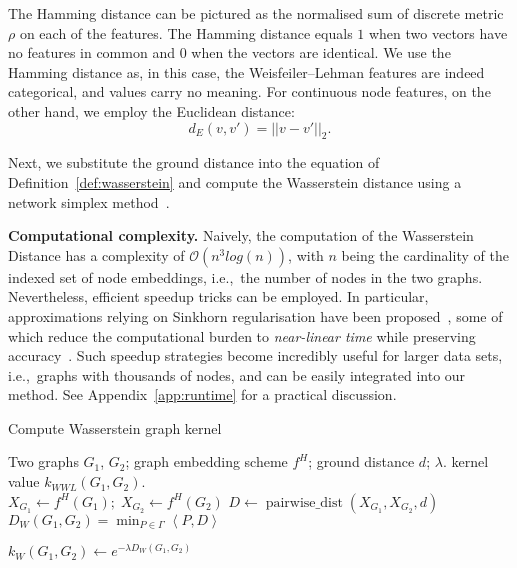 \documentclass{article}
\DeclareMathOperator{\pairwisedist}{pairwise\_dist}
\begin{document}
The Hamming distance can be pictured as the normalised sum of discrete metric $\rho$ on each of the features.
The Hamming distance equals $1$ when two vectors have no features in common and $0$ when the vectors are identical. 
We use the Hamming distance as, in this case, the Weisfeiler--Lehman features are indeed categorical, and values carry no meaning.
For continuous node features, on the other hand, we employ the Euclidean distance: 
\begin{equation}
    d_E(v,v')=||v-v'||_2.
\end{equation}

Next, we substitute the ground distance into the equation of Definition~\ref{def:wasserstein} and compute the Wasserstein distance using a network simplex method~\citep{peyre2019computational}. 

\textbf{Computational complexity.}
Naively, the computation of the Wasserstein Distance has a complexity of $\mathcal{O}(n^3log(n))$, with $n$ being the cardinality of the indexed set of node embeddings, i.e.,\ the number of nodes in the two graphs. Nevertheless, efficient speedup tricks can be employed. In particular, approximations relying on Sinkhorn regularisation have been proposed~\citep{cuturi2013sinkhorn}, some of which reduce the computational burden to \textit{near-linear time} while preserving accuracy~\citep{altschuler2017near}. Such speedup strategies become incredibly useful for larger data sets, i.e.,\ graphs with thousands of nodes, and can be easily integrated into our method. See  Appendix~\ref{app:runtime} for a practical discussion.



\begin{algorithm}[tb]
   \caption{Compute Wasserstein graph kernel}
   \label{alg:gwk}
\begin{algorithmic}
    Two graphs $G_1$, $G_2$; graph embedding scheme $f^H$; ground distance $d$; $\lambda$.
    kernel value $k_{WWL}(G_1,G_2)$.
   \\
   \STATE $X_{G_1} \leftarrow f^H(G_1); \; X_{G_2} \leftarrow f^H(G_2)$ 
   \STATE $D \leftarrow \pairwisedist(X_{G_1},X_{G_2},d)$ 
   \STATE $D_W(G_1,G_2) = \min_{P \in \Gamma} \left \langle P, D\right \rangle$ 
   
   \STATE $k_W(G_1,G_2) \leftarrow e^{- \lambda D_W(G_1,G_2)}$
\end{algorithmic}
\end{algorithm}
\end{document}

